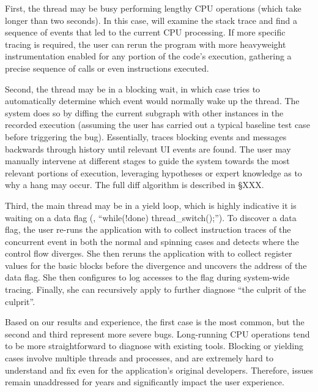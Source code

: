 First, the thread may be busy performing lengthy CPU operations (which take
longer than two seconds). In this case, \xxx will examine the stack trace and
find a sequence of events that led to the current CPU processing. If more
specific tracing is required, the user can rerun the program with more
heavyweight instrumentation enabled for any portion of the code's execution,
gathering a precise sequence of calls or even instructions executed.

Second, the thread may be in a blocking wait, in which case \xxx tries to
automatically determine which event would normally wake up the thread. The
system does so by diffing the current subgraph with other instances in the
recorded execution (assuming the user has carried out a typical baseline test
case before triggering the bug). Essentially, \xxx traces blocking events and
messages backwards through history until relevant UI events are found. The user
may manually intervene at different stages to guide the system towards the most
relevant portions of execution, leveraging hypotheses or expert knowledge as to
why a hang may occur. The full diff algorithm is described in \S XXX.

Third, the main thread may be in a yield loop, which is highly indicative it
is waiting on a data flag (\eg, ``while(!done)
thread\_switch();'').
To discover a data flag, the user re-runs the application
with \xxx to collect instruction traces of the concurrent event in both the
normal and spinning cases and detects where the control flow diverges.  She
then reruns the application with \xxx to collect register values for the basic
blocks before the divergence and uncovers the address of the data flag.  She
then configures \xxx to log accesses to the flag during system-wide tracing.
Finally, she can recursively apply \xxx to further diagnose ``the culprit of
the culprit''.

Based on our results and experience, the first case is the most common, but the
second and third represent more severe bugs. Long-running CPU operations tend
to be more straightforward to diagnose with existing tools. Blocking or
yielding cases involve multiple threads and processes, and are extremely hard
to understand and fix even for the application's original developers.
Therefore, issues remain unaddressed for years and significantly impact the
user experience.



